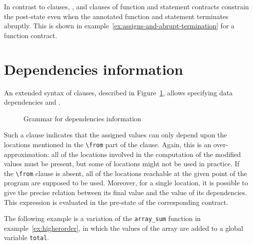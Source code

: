 In contrast to \ensures clauses, \assigns{}, 
\allocates{} 
and \frees{} clauses of function 
and statement contracts constrain the post-state 
even when the annotated function and statement terminates  abruptly. 
This is shown in example~\ref{ex:assigns-and-abrupt-termination} for a function contract.


\section{Dependencies information}
\label{sec:func-dep}

\experimental

An extended syntax of \assigns clauses, described in
Figure~\ref{fig:gram:dep}, allows specifying data
dependencies and
.

\begin{figure}[t]
  \begin{cadre}
      
    \end{cadre}
  \caption{Grammar for dependencies information}
\label{fig:gram:dep}
\end{figure}

Such a clause indicates that the assigned values can only depend upon
the locations mentioned in the \lstinline|\from| part of the
clause. Again, this is an over-approximation: all of the locations
involved in the computation of the modified values must be present,
but some of locations might not be used in practice. If the
\lstinline|\from| clause is absent, all of the locations reachable at the
given point of the program are supposed to be used.
Moreover, for a single location, it is possible to give the precise
relation between its final value and the value of its
dependencies. This expression is evaluated in the pre-state of the
corresponding contract.

\begin{example}
  The following example is a variation of the \lstinline+array_sum+
  function in example~\ref{ex:higherorder}, in which the values of
  the array are added to a global variable \lstinline+total+.


\end{example}


